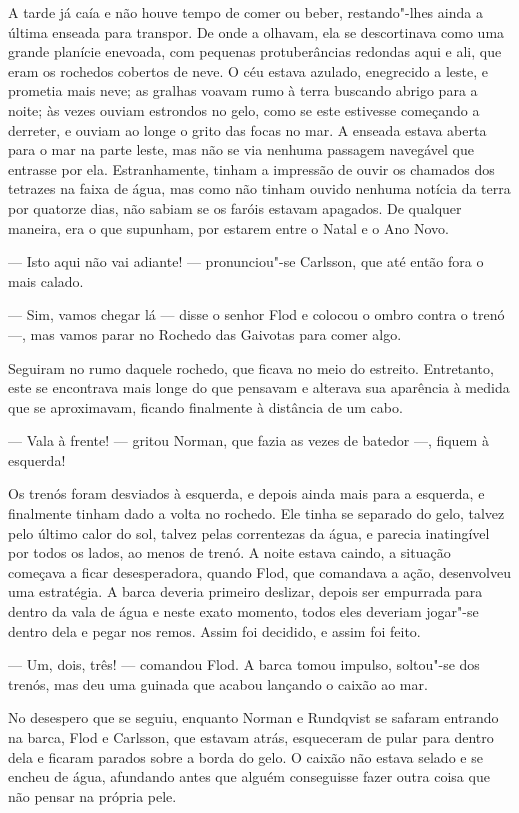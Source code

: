 A tarde já caía e não houve tempo de comer ou beber,
restando"-lhes ainda a última enseada para transpor. De onde a olhavam, ela se
descortinava como uma grande planície enevoada, com pequenas protuberâncias
redondas aqui e ali, que eram os rochedos cobertos de neve. O céu estava azulado, enegrecido a
leste, e prometia mais neve; as gralhas voavam rumo à terra buscando abrigo
para a noite; às vezes ouviam estrondos no gelo, como se este estivesse
começando a derreter, e ouviam ao longe o grito das focas no mar. A enseada
estava aberta para o mar na parte leste, mas não se via nenhuma passagem navegável
que entrasse por ela. Estranhamente, tinham a impressão de ouvir os chamados dos
tetrazes na faixa de água, mas como não tinham ouvido nenhuma notícia da terra por
quatorze dias, não sabiam se os faróis estavam apagados. De qualquer maneira,
era o que supunham, por estarem entre o Natal e o Ano Novo.

--- Isto aqui não vai adiante! --- pronunciou"-se Carlsson, que até então fora o
mais calado.

--- Sim, vamos chegar lá --- disse o senhor Flod e colocou o ombro contra o trenó
---, mas vamos parar no Rochedo das Gaivotas para comer algo.

Seguiram no rumo daquele rochedo, que ficava no meio do estreito.
Entretanto, este se encontrava mais longe do que pensavam e alterava sua aparência
à medida que se aproximavam, ficando finalmente à distância de um cabo.

--- Vala à frente! --- gritou Norman, que fazia as vezes de batedor ---, fiquem à esquerda!

Os trenós foram desviados à esquerda, e depois ainda mais para a esquerda, e
finalmente tinham dado a volta no rochedo. Ele tinha se separado do gelo, talvez
pelo último calor do sol, talvez pelas correntezas da água, e parecia
inatingível por todos os lados, ao menos de trenó. A noite estava caindo, a
situação começava a ficar desesperadora, quando Flod, que comandava a ação,
desenvolveu uma estratégia. A barca deveria primeiro deslizar, depois ser
empurrada para dentro da vala de água e neste exato momento, todos eles deveriam
jogar"-se dentro dela e pegar nos remos. Assim foi decidido, e assim foi feito.

--- Um, dois, três! --- comandou Flod. A barca tomou impulso, soltou"-se dos
trenós, mas deu uma guinada que acabou lançando o caixão ao mar.

No desespero que se seguiu, enquanto Norman e Rundqvist se safaram entrando na
barca, Flod e Carlsson, que estavam atrás, esqueceram de pular para dentro dela
e ficaram parados sobre a borda do gelo. O caixão não estava selado e se encheu
de água, afundando antes que alguém conseguisse fazer outra coisa que não pensar
na própria pele.

